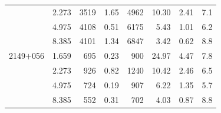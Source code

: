 \begin{longtable}{|c|c|r|c|r|r|r|r|}
           & 2.273 &  3519 &  1.65 &  4962 & 10.30 &  2.41 &   7.1 \\
           & 4.975 &  4108 &  0.51 &  6175 &  5.43 &  1.01 &   6.2 \\
           & 8.385 &  4101 &  1.34 &  6847 &  3.42 &  0.62 &   8.8 \\
2149$+$056 & 1.659 &   695 &  0.23 &   900 & 24.97 &  4.47 &   7.8 \\
           & 2.273 &   926 &  0.82 &  1240 & 10.42 &  2.46 &   6.5 \\
           & 4.975 &   724 &  0.19 &   907 &  6.22 &  1.35 &   5.7 \\
           & 8.385 &   552 &  0.31 &   702 &  4.03 &  0.87 &   8.8 \\
\end{longtable}


